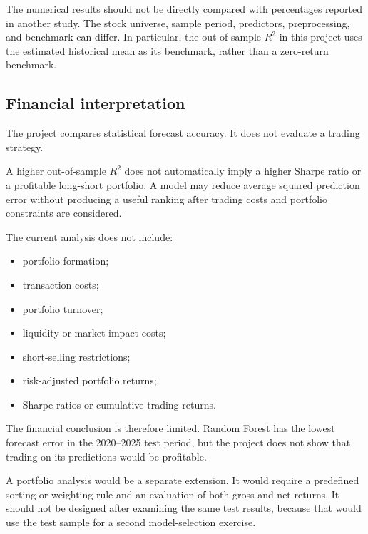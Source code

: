\documentclass[11pt,a4paper]{article}
\begin{document}
The numerical results should not be directly compared with percentages reported
in another study. The stock universe, sample period, predictors, preprocessing,
and benchmark can differ. In particular, the out-of-sample \(R^2\) in this
project uses the estimated historical mean as its benchmark, rather than a
zero-return benchmark.

\subsection{Financial interpretation}

The project compares statistical forecast accuracy. It does not evaluate a
trading strategy.

A higher out-of-sample \(R^2\) does not automatically imply a higher Sharpe
ratio or a profitable long-short portfolio. A model may reduce average squared
prediction error without producing a useful ranking after trading costs and
portfolio constraints are considered.

The current analysis does not include:

\begin{itemize}
  \item portfolio formation;
  \item transaction costs;
  \item portfolio turnover;
  \item liquidity or market-impact costs;
  \item short-selling restrictions;
  \item risk-adjusted portfolio returns;
  \item Sharpe ratios or cumulative trading returns.
\end{itemize}

The financial conclusion is therefore limited. Random Forest has the lowest
forecast error in the 2020--2025 test period, but the project does not show that
trading on its predictions would be profitable.

A portfolio analysis would be a separate extension. It would require a
predefined sorting or weighting rule and an evaluation of both gross and net
returns. It should not be designed after examining the same test results,
because that would use the test sample for a second model-selection exercise.

\end{document}
